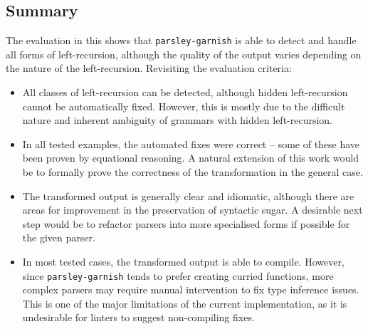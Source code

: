 \documentclass[../../main.tex]{subfiles}
\begin{document}
\subsection*{Summary}
The evaluation in this  shows that \texttt{parsley-garnish} is able to detect and handle all forms of left-recursion, although the quality of the output varies depending on the nature of the left-recursion.
Revisiting the evaluation criteria:
\begin{itemize}
  \item All classes of left-recursion can be detected, although hidden left-recursion cannot be automatically fixed. However, this is mostly due to the difficult nature and inherent ambiguity of grammars with hidden left-recursion.
  \item In all tested examples, the automated fixes were correct -- some of these have been proven by equational reasoning. A natural extension of this work would be to formally prove the correctness of the transformation in the general case.
  \item The transformed output is generally clear and idiomatic, although there are areas for improvement in the preservation of syntactic sugar. A desirable next step would be to refactor  parsers into more specialised forms if possible for the given parser.
  \item In most tested cases, the transformed output is able to compile. However, since \texttt{parsley-garnish} tends to prefer creating curried functions, more complex parsers may require manual intervention to fix type inference issues. This is one of the major limitations of the current implementation, as it is undesirable for linters to suggest non-compiling fixes.
\end{itemize}



\end{document}
